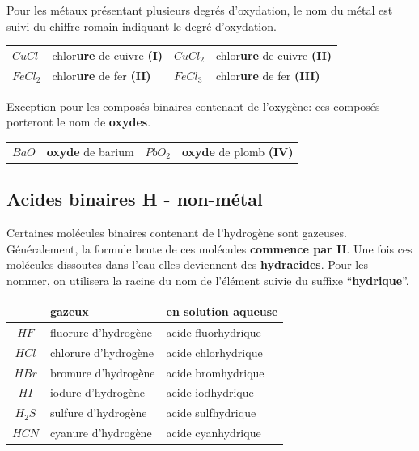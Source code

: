 \documentclass[
  11pt,
  a4paper,
  openany]{book}
\begin{document}
Pour les métaux présentant plusieurs degrés d'oxydation, le nom du métal est suivi du chiffre romain indiquant le degré d'oxydation.

\begin{longtable}[]{@{}
  >{\centering\arraybackslash}p{}
  >{\raggedright\arraybackslash}p{}
  >{\centering\arraybackslash}p{}
  >{\raggedright\arraybackslash}p{}@{}}
\toprule\noalign{}
\endhead
\bottomrule\noalign{}
\endlastfoot
\(CuCl\) & chlor\textbf{ure} de cuivre \textbf{(I)} & \(CuCl_2\) & chlor\textbf{ure} de cuivre \textbf{(II)} \\
\(FeCl_2\) & chlor\textbf{ure} de fer \textbf{(II)} & \(FeCl_3\) & chlor\textbf{ure} de fer \textbf{(III)} \\
\end{longtable}

Exception pour les composés binaires contenant de l'oxygène: ces composés porteront le nom de \textbf{oxydes}.

\begin{longtable}[]{@{}clcl@{}}
\toprule\noalign{}
\endhead
\bottomrule\noalign{}
\endlastfoot
\(BaO\) & \textbf{oxyde} de barium & \(PbO_2\) & \textbf{oxyde} de plomb \textbf{(IV)} \\
\end{longtable}

\subsection{Acides binaires \textbar{} H - non-métal}\label{acides-binaires-h---non-muxe9tal}

Certaines molécules binaires contenant de l'hydrogène sont gazeuses. Généralement, la formule brute de ces molécules \textbf{commence par H}. Une fois ces molécules dissoutes dans l'eau elles deviennent des \textbf{hydracides}. Pour les nommer, on utilisera la racine du nom de l'élément suivie du suffixe ``\textbf{hydrique}''.

\begin{longtable}[]{@{}cll@{}}
\toprule\noalign{}
& gazeux & en solution aqueuse \\
\midrule\noalign{}
\endhead
\bottomrule\noalign{}
\endlastfoot
\(HF\) & fluorure d'hydrogène & acide fluorhydrique \\
\(HCl\) & chlorure d'hydrogène & acide chlorhydrique \\
\(HBr\) & bromure d'hydrogène & acide bromhydrique \\
\(HI\) & iodure d'hydrogène & acide iodhydrique \\
\(H_2S\) & sulfure d'hydrogène & acide sulfhydrique \\
\(HCN\) & cyanure d'hydrogène & acide cyanhydrique \\
\end{longtable}
\end{document}

